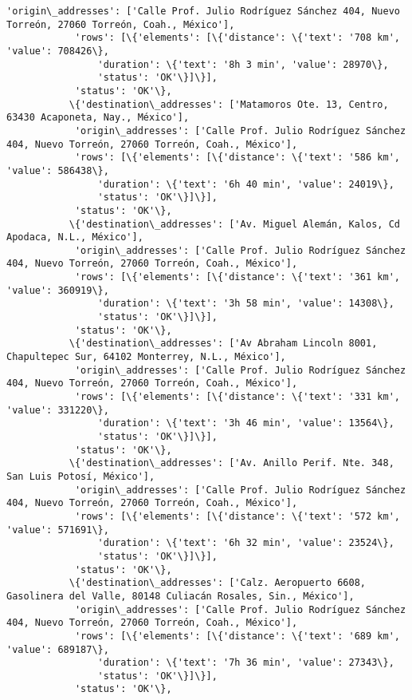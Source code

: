 \documentclass[11pt]{article}
\begin{document}
\begin{Verbatim}[commandchars=\\\{\}]
            'origin\_addresses': ['Calle Prof. Julio Rodríguez Sánchez 404, Nuevo Torreón, 27060 Torreón, Coah., México'],
            'rows': [\{'elements': [\{'distance': \{'text': '708 km', 'value': 708426\},
                'duration': \{'text': '8h 3 min', 'value': 28970\},
                'status': 'OK'\}]\}],
            'status': 'OK'\},
           \{'destination\_addresses': ['Matamoros Ote. 13, Centro, 63430 Acaponeta, Nay., México'],
            'origin\_addresses': ['Calle Prof. Julio Rodríguez Sánchez 404, Nuevo Torreón, 27060 Torreón, Coah., México'],
            'rows': [\{'elements': [\{'distance': \{'text': '586 km', 'value': 586438\},
                'duration': \{'text': '6h 40 min', 'value': 24019\},
                'status': 'OK'\}]\}],
            'status': 'OK'\},
           \{'destination\_addresses': ['Av. Miguel Alemán, Kalos, Cd Apodaca, N.L., México'],
            'origin\_addresses': ['Calle Prof. Julio Rodríguez Sánchez 404, Nuevo Torreón, 27060 Torreón, Coah., México'],
            'rows': [\{'elements': [\{'distance': \{'text': '361 km', 'value': 360919\},
                'duration': \{'text': '3h 58 min', 'value': 14308\},
                'status': 'OK'\}]\}],
            'status': 'OK'\},
           \{'destination\_addresses': ['Av Abraham Lincoln 8001, Chapultepec Sur, 64102 Monterrey, N.L., México'],
            'origin\_addresses': ['Calle Prof. Julio Rodríguez Sánchez 404, Nuevo Torreón, 27060 Torreón, Coah., México'],
            'rows': [\{'elements': [\{'distance': \{'text': '331 km', 'value': 331220\},
                'duration': \{'text': '3h 46 min', 'value': 13564\},
                'status': 'OK'\}]\}],
            'status': 'OK'\},
           \{'destination\_addresses': ['Av. Anillo Perif. Nte. 348, San Luis Potosí, México'],
            'origin\_addresses': ['Calle Prof. Julio Rodríguez Sánchez 404, Nuevo Torreón, 27060 Torreón, Coah., México'],
            'rows': [\{'elements': [\{'distance': \{'text': '572 km', 'value': 571691\},
                'duration': \{'text': '6h 32 min', 'value': 23524\},
                'status': 'OK'\}]\}],
            'status': 'OK'\},
           \{'destination\_addresses': ['Calz. Aeropuerto 6608, Gasolinera del Valle, 80148 Culiacán Rosales, Sin., México'],
            'origin\_addresses': ['Calle Prof. Julio Rodríguez Sánchez 404, Nuevo Torreón, 27060 Torreón, Coah., México'],
            'rows': [\{'elements': [\{'distance': \{'text': '689 km', 'value': 689187\},
                'duration': \{'text': '7h 36 min', 'value': 27343\},
                'status': 'OK'\}]\}],
            'status': 'OK'\},

\end{Verbatim}
\end{document}
